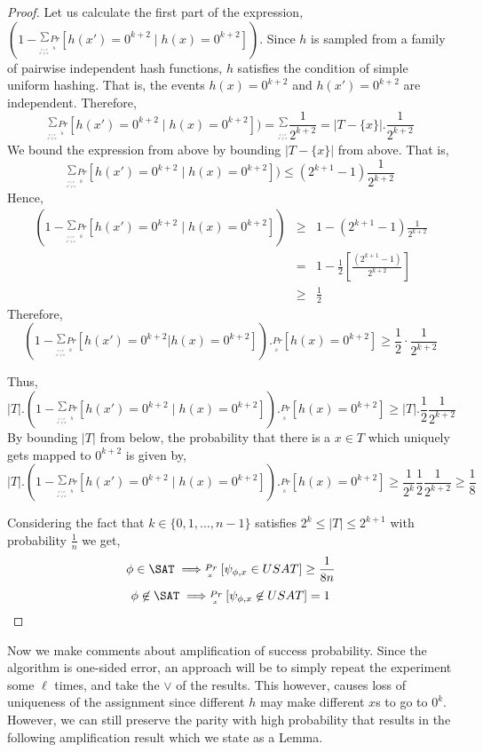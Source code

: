 \documentclass[11pt]{article}
\begin{document}
\begin{proof}
Let us calculate the first part of the expression, $(1-\stackrel{\sum}{_{_{_{_{\stackrel{x' \in T}{x' \neq x}}}}}}\stackrel{Pr}{_{_{_{h}}}}[h(x')=0^{k+2} \mid h(x)=0^{k+2}])$. Since $h$ is sampled from a family of pairwise independent hash functions, $h$ satisfies the condition of simple uniform hashing. That is, the events $h(x)=0^{k+2}$ and $h(x')=0^{k+2}$ are independent. Therefore,
\[
\stackrel{\sum}{_{_{_{_{\stackrel{x' \in T}{x' \neq x}}}}}}\stackrel{Pr}{_{_{_{h}}}}[h(x')=0^{k+2} \mid h(x)=0^{k+2}])=\stackrel{\sum}{_{_{_{_{\stackrel{x' \in T}{x' \neq x}}}}}}\frac{1}{2^{k+2}}= |T-\{x\}|.\frac{1}{2^{k+2}}
\]
We bound the expression from above by bounding $|T-\{x\}|$ from above. That is,
\[
\stackrel{\sum}{_{_{_{_{\stackrel{x' \in T}{x' \neq x}}}}}}\stackrel{Pr}{_{_{_{h}}}}[h(x')=0^{k+2}\mid h(x)=0^{k+2}]) \leq (2^{k+1}-1) \frac{1}{2^{k+2}}
\]
Hence, 
\begin{eqnarray*}
(1-\stackrel{\sum}{_{_{_{_{\stackrel{x' \in T}{x' \neq x}}}}}}\stackrel{Pr}{_{_{_{h}}}}[h(x')=0^{k+2}\mid h(x)=0^{k+2}]) 
& \geq & 1-(2^{k+1}-1)\frac{1}{2^{k+2}} \\
& = & 1-\frac{1}{2}[\frac{(2^{k+1}-1)}{2^{k+2}}] \\
& \geq & \frac{1}{2}
\end{eqnarray*}
Therefore, 
\[
(1-\stackrel{\sum}{_{_{_{_{\stackrel{x' \in T}{x' \neq x}}}}}}\stackrel{Pr}{_{_{_{h}}}}[h(x')=0^{k+2}|h(x)=0^{k+2}]).\stackrel{Pr}{_{_{_{h}}}}[h(x)=0^{k+2}]\geq \frac{1}{2}\cdot \frac{1}{2^{k+2}}
\]

Thus, 
\[
|T|.(1-\stackrel{\sum}{_{_{_{_{\stackrel{x' \in T}{x' \neq x}}}}}}\stackrel{Pr}{_{_{_{h}}}}[h(x')=0^{k+2}\mid h(x)=0^{k+2}]).\stackrel{Pr}{_{_{_{h}}}}[h(x)=0^{k+2}] \geq  |T|.\frac{1}{2}\frac{1}{2^{k+2}} 
\]
By bounding $|T|$ from below, the probability that there is a $x \in T$ which uniquely gets mapped to $0^{k+2}$ is given by,
\[
|T|.(1-\stackrel{\sum}{_{_{_{_{\stackrel{x' \in T}{x' \neq x}}}}}}\stackrel{Pr}{_{_{_{h}}}}[h(x')=0^{k+2}\mid h(x)=0^{k+2}]).\stackrel{Pr}{_{_{_{h}}}}[h(x)=0^{k+2}]\geq\frac{1}{2^{k}}\frac{1}{2}\frac{1}{2^{k+2}} \geq \frac{1}{8}
\]

Considering the fact that $k \in \{0,1,...,n-1\}$ satisfies $2^k \leq |T| \leq 2^{k+1}$ with probability $\frac{1}{n}$ we get,
\[
\phi \in \SAT \implies \stackrel{Pr}{_{_{_{x}}}}[\psi_{\phi,x} \in USAT] \geq \frac{1}{8n}
\]
\[
\phi \not\in \SAT \implies \stackrel{Pr}{_{_{_{x}}}}[\psi_{\phi,x} \not\in USAT] = 1
\]
\end{proof}

Now we make comments about amplification of success probability. Since the algorithm is one-sided error, an approach will be to simply repeat the experiment some $\ell$ times, and take the $\lor$ of the results. This however, causes loss of uniqueness of the assignment since different $h$ may make different $x$s to go to $0^k$. However, we can still preserve the parity with high probability that results in the following amplification result which we state as a Lemma.
\end{document}
